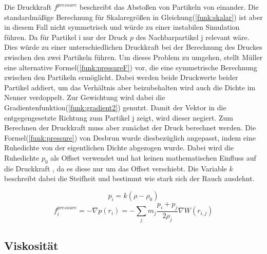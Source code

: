 \documentclass[intern,palatino]{cgBA}
\begin{document}
Die Druckkraft $f^{pressure}$ beschreibt das Abstoßen von Partikeln von einander. Die standardmäßige Berechnung für Skalaregrößen in Gleichung(\ref{funk:skalar}) ist aber in diesem Fall nicht symmetrisch und würde zu einer instabilen Simulation führen. Da für Partikel i nur der Druck $p$ des Nachbarpartikel j relevant wäre. Dies würde zu einer unterschiedlichen Druckkraft bei der Berechnung des Druckes zwischen den zwei Partikeln führen. Um dieses Problem zu umgehen, stellt Müller \cite{muller2003particle} eine alternative Formel(\ref{funk:pressureF}) vor, die eine symmetrische Berechnung zwischen den Partikeln ermöglicht. Dabei werden beide Druckwerte beider Partikel addiert, um das Verhältnis aber beizubehalten wird auch die Dichte im Nenner verdoppelt. Zur Gewichtung wird dabei die Gradientenfunktion(\ref{funk:gradient2}) genutzt. Damit der Vektor in die entgegengesetzte Richtung zum Partikel j zeigt, wird dieser negiert.
\newline
Zum Berechnen der Druckkraft muss aber zunächst der Druck berechnet werden. Die Formel(\ref{funk:pressure}) von Desbrun \cite{desbrun1996smoothed} wurde diesbezüglich angepasst, indem eine Ruhedichte von der eigentlichen Dichte abgezogen wurde. Dabei wird die Ruhedichte $p_0$ als Offset verwendet und hat keinen mathematischen Einfluss auf die Druckkraft \cite{muller2003particle}, da es diese nur um das Offset verschiebt. Die Variable $k$ beschreibt dabei die Steifheit und bestimmt wie stark sich der Rauch ausdehnt.

\begin{equation}\label{funk:pressure}
p_i = k(\rho - \rho_0)
\end{equation}
\begin{equation}\label{funk:pressureF}
f^{pressure}_i = - \nabla p(r_i) = - \sum_j m_j \frac{p_i+p_j}{2\rho_j} \nabla W(r_{i,j})
\end{equation}


\subsection{Viskosität}\label{visc}
\end{document}
